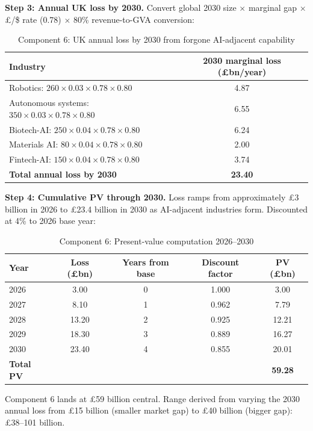 \documentclass[11pt,letterpaper]{article}
\theoremstyle{remark}
\begin{document}
\textbf{Step 3: Annual UK loss by 2030.} Convert global 2030 size $\times$ marginal gap $\times$ \pounds/\$ rate (0.78) $\times$ 80\% revenue-to-GVA conversion:

\begin{table}[ht]
\centering
\caption{Component 6: UK annual loss by 2030 from forgone AI-adjacent capability}
\begin{tabular}{lc}
\toprule
Industry & 2030 marginal loss (\pounds bn/year) \\
\midrule
Robotics: $260 \times 0.03 \times 0.78 \times 0.80$ & 4.87 \\
Autonomous systems: $350 \times 0.03 \times 0.78 \times 0.80$ & 6.55 \\
Biotech-AI: $250 \times 0.04 \times 0.78 \times 0.80$ & 6.24 \\
Materials AI: $80 \times 0.04 \times 0.78 \times 0.80$ & 2.00 \\
Fintech-AI: $150 \times 0.04 \times 0.78 \times 0.80$ & 3.74 \\
\midrule
\textbf{Total annual loss by 2030} & \textbf{23.40} \\
\bottomrule
\end{tabular}
\end{table}

\textbf{Step 4: Cumulative PV through 2030.} Loss ramps from approximately \pounds3 billion in 2026 to \pounds23.4 billion in 2030 as AI-adjacent industries form. Discounted at 4\% to 2026 base year:

\begin{table}[ht]
\centering
\caption{Component 6: Present-value computation 2026--2030}
\begin{tabular}{lcccc}
\toprule
Year & Loss (\pounds bn) & Years from base & Discount factor & PV (\pounds bn) \\
\midrule
2026 & 3.00 & 0 & 1.000 & 3.00 \\
2027 & 8.10 & 1 & 0.962 & 7.79 \\
2028 & 13.20 & 2 & 0.925 & 12.21 \\
2029 & 18.30 & 3 & 0.889 & 16.27 \\
2030 & 23.40 & 4 & 0.855 & 20.01 \\
\midrule
\textbf{Total PV} & & & & \textbf{59.28} \\
\bottomrule
\end{tabular}
\end{table}

Component 6 lands at \pounds59 billion central. Range derived from varying the 2030 annual loss from \pounds15 billion (smaller market gap) to \pounds40 billion (bigger gap): \pounds38--101 billion.
\end{document}
